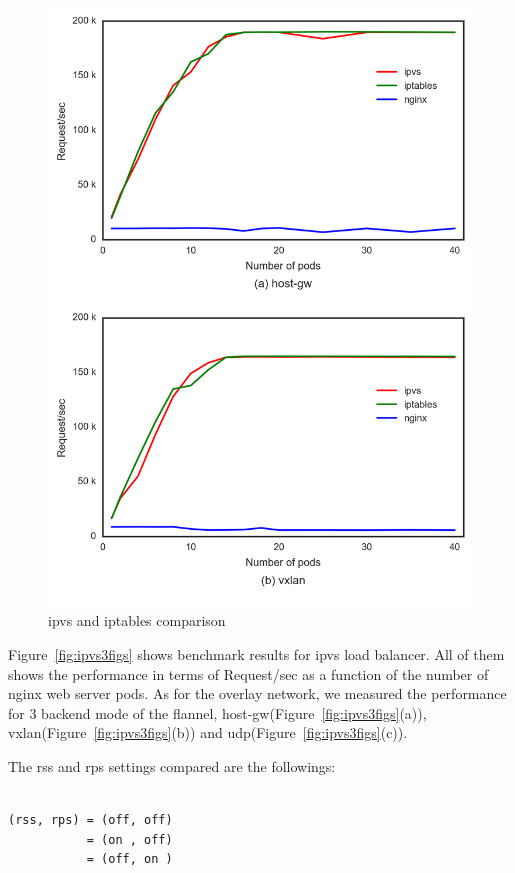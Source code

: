 \begin{figure}
\includegraphics[width=\columnwidth]{Figs/ipvs-iptables-nginx_2figs}
\caption{ipvs and iptables comparison}
\label{fig:ipvs-iptables-nginx_2figs}
\end{figure}

Figure~\ref{fig:ipvs3figs} shows benchmark results for ipvs load balancer. 
All of them shows the performance in terms of Request/sec as a function of the number of nginx web server pods.
As for the overlay network, we measured the performance for 3 backend mode of the flannel, 
host-gw(Figure~\ref{fig:ipvs3figs}(a)), vxlan(Figure~\ref{fig:ipvs3figs}(b)) and udp(Figure~\ref{fig:ipvs3figs}(c)).

The rss and rps settings compared are the followings: 

\begin{center}
\begin{minipage}{0.8\columnwidth}
\begin{verbatim}

(rss, rps) = (off, off)
           = (on , off)
           = (off, on )

\end{verbatim}
\end{minipage}
\end{center}

